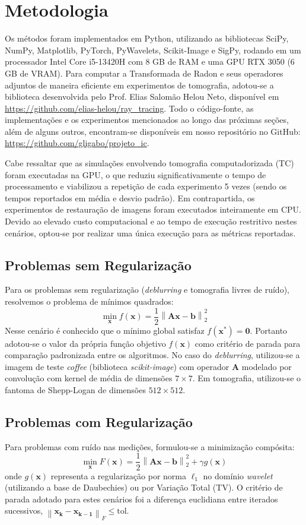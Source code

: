\documentclass[12pt]{article}
\newcommand{\norm}[1]{\left\lVert#1\right\rVert}
\begin{document}
\section{Metodologia}

Os métodos foram implementados em Python, utilizando as bibliotecas SciPy, NumPy, Matplotlib, PyTorch, PyWavelets, Scikit-Image e SigPy, rodando em um processador Intel Core i5-13420H com 8 GB de RAM e uma GPU RTX 3050 (6 GB de VRAM). Para computar a Transformada de Radon e seus operadores adjuntos de maneira eficiente em experimentos de tomografia, adotou-se a biblioteca desenvolvida pelo Prof. Elias Salomão Helou Neto, disponível em \url{https://github.com/elias-helou/ray_tracing}. Todo o código-fonte, as implementações e os experimentos mencionados ao longo das próximas seções, além de alguns outros, encontram-se disponíveis em nosso repositório no GitHub: \url{https://github.com/gligabo/projeto_ic}.

Cabe ressaltar que as simulações envolvendo tomografia computadorizada (TC) foram executadas na GPU, o que reduziu significativamente o tempo de processamento e viabilizou a repetição de cada experimento 5 vezes (sendo os tempos reportados em média e desvio padrão). Em contrapartida, os experimentos de restauração de imagens foram executados inteiramente em CPU. Devido ao elevado custo computacional e ao tempo de execução restritivo nestes cenários, optou-se por realizar uma única execução para as métricas reportadas. 

 \subsection{Problemas sem Regularização}
Para os problemas sem regularização (\textit{deblurring} e tomografia livres de ruído), resolvemos o problema de mínimos quadrados:
\[
\min_{\mathbf{x}} f(\mathbf{x}) = \frac{1}{2}\norm{\mathbf{Ax - b}}_2^2
\]
Nesse cenário é conhecido que o mínimo global satisfaz $f(\mathbf{x^*}) = \mathbf{0}$. Portanto adotou-se o valor da própria função objetivo $f(\mathbf{x})$ como critério de parada para comparação padronizada entre os algoritmos. No caso do \textit{deblurring}, utilizou-se a imagem de teste \textit{coffee} (biblioteca \textit{scikit-image}) com operador $\mathbf{A}$ modelado por convolução com kernel de média de dimensões $7 \times 7$. Em tomografia, utilizou-se o fantoma de Shepp-Logan de dimensões $512 \times 512$.

\subsection{Problemas com Regularização}
Para problemas com ruído nas medições, formulou-se a minimização compósita:
\[
\min_{\mathbf{x}} F(\mathbf{x}) = \frac{1}{2}\norm{\mathbf{Ax} - \mathbf{b}}_2^2 + \gamma g(\mathbf{x})
\]
onde $g(\mathbf{x})$ representa a regularização por norma $\ell_1$ no domínio \textit{wavelet} (utilizando a base de Daubechies) ou por Variação Total (TV). O critério de parada adotado para estes cenários foi a diferença euclidiana entre iterados sucessivos, $\norm{\mathbf{x_k} - \mathbf{x_{k-1}}}_F \leq \text{tol}$.
\end{document}
